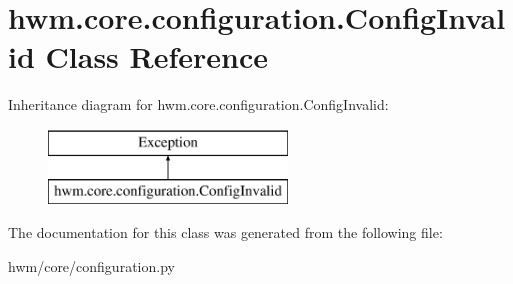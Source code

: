 \hypertarget{classhwm_1_1core_1_1configuration_1_1_config_invalid}{\section{hwm.\-core.\-configuration.\-Config\-Invalid Class Reference}
\label{classhwm_1_1core_1_1configuration_1_1_config_invalid}
}
Inheritance diagram for hwm.\-core.\-configuration.\-Config\-Invalid\-:\begin{figure}[H]
\begin{center}
\leavevmode
\includegraphics[height=2.000000cm]{classhwm_1_1core_1_1configuration_1_1_config_invalid}
\end{center}
\end{figure}


The documentation for this class was generated from the following file\-:\begin{DoxyCompactItemize}
\item 
hwm/core/configuration.\-py\end{DoxyCompactItemize}
